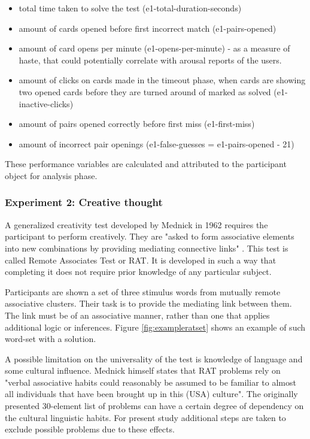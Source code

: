 		\begin{itemize}
			\item total time taken to solve the test (e1-total-duration-seconds)
			\item amount of cards opened before first incorrect match (e1-pairs-opened)
			\item amount of card opens per minute (e1-opens-per-minute) - as a measure of haste, that could potentially correlate with arousal reports of the users.
			\item amount of clicks on cards made in the timeout phase, when cards are showing two opened cards before they are turned around of marked as solved (e1-inactive-clicks)
			\item amount of pairs opened correctly before first miss (e1-first-miss)
			\item amount of incorrect pair openings (e1-false-guesses = e1-pairs-opened - 21)
		\end{itemize}
	
		These performance variables are calculated and attributed to the participant object for analysis phase.
		
		\subsubsection{Experiment 2: Creative thought} \label{sec:creativity}
		
		A generalized creativity test developed by Mednick \cite{Mednick1962} in 1962 requires the participant to perform creatively. They are "asked to form associative elements into new combinations by providing mediating connective links" \cite[p. 226]{Mednick1962}. This test is called Remote Associates Test or RAT.
		It is developed in such a way that completing it does not require prior knowledge of any particular subject. 
		
		Participants are shown a set of three stimulus words from mutually remote associative clusters. Their task is to provide the mediating link between them. The link must be of an associative manner, rather than one that applies additional logic or inferences. Figure \ref{fig:exampleratset} shows an example of such word-set with a solution.
		
		A possible limitation on the universality of the test is knowledge of language and some cultural influence. Mednick himself states that RAT problems rely on "verbal associative habits could reasonably be assumed to be familiar to almost all individuals that have been brought up in this (USA) culture". The originally presented 30-element list of problems can have a certain degree of dependency on the cultural linguistic habits. For present study additional steps are taken to exclude possible problems due to these effects. 
		

